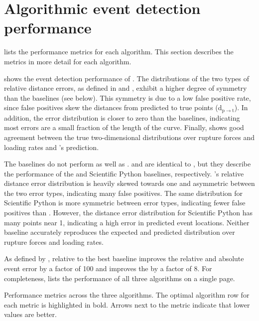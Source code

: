 \section{Algorithmic event detection performance}

 lists the performance metrics for each algorithm. This section describes the metrics in more detail for each algorithm. 

 shows the event detection performance of \name{}. The distributions of the two types of relative distance errors, as defined in  and , exhibit a higher degree of symmetry than the baselines (see below). This symmetry is due to a low false positive rate, since false positives skew the distances from predicted to true points (d$_{\mathrm{p}\rightarrow\mathrm{t}}$). In addition, the error distribution is closer to zero than the baselines, indicating most errors are a small fraction of the length of the curve. Finally,  shows good agreement between the true two-dimensional distributions over rupture forces and loading rates and \name{}'s prediction.

The baselines do not perform as well as \name{}.  and  are identical to , but they describe the performance of the \OpenFovea{} and Scientific Python baselines, respectively. \OpenFovea{}'s relative distance error distribution is heavily skewed towards one and asymmetric between the two error types, indicating many false positives. The same distribution for Scientific Python is more symmetric between error types, indicating fewer false positives than \OpenFovea{}. However, the distance error distribution for Scientific Python has many points near 1, indicating a high error in predicted event locations. Neither baseline accurately reproduces the expected and predicted distribution over rupture forces and loading rates.

As defined by , relative to the best baseline \name{} improves the relative and absolute event error by a factor of 100 and improves the \BccLong{} by a factor of 8. For completeness,  lists the performance of all three algorithms on a single page.

\begin{table}
\caption[Algorithm performance]{ Performance metrics across the three algorithms. The optimal algorithm row for each metric is highlighted in bold. Arrows next to the metric indicate that lower values are better.}

\end{table}





